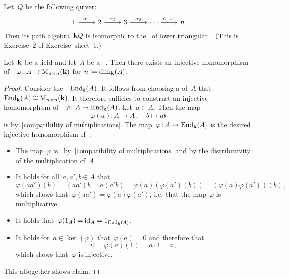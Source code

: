 \begin{example*}
  Let~$Q$ be the following quiver:
  \[
    \begin{tikzcd}
        1
        \arrow{r}[above]{\alpha_1}
      & 2
        \arrow{r}[above]{\alpha_2}
      & 3
        \arrow{r}[above]{\alpha_3}
      & \dotsb
        \arrow{r}[above]{\alpha_{n-1}}
      & n
    \end{tikzcd}
  \]
  Then its path algebra~$\mathbf{k} Q$ is isomorphic to the~{\kalg} of lower triangular~.
  (This is Exercise~2 of Exercise~sheet~1.)
\end{example*}


\begin{lemma}
  Let~$\mathbf{k}$ be a field and let~$A$ be a {\fd}~{\kalg}.
  Then there exists an injective homomorphism of~{\kalgs}~$\varphi \colon A \to \operatorname{M}_{n \times n}(\mathbf{k})$ for~$n \coloneqq \dim_{\mathbf{k}}(A)$.
\end{lemma}


\begin{proof}
  Consider the~{\kalg}~$\operatorname{End}_{\mathbf{k}}(A)$.
  It follows from choosing a  of~$A$ that~$\operatorname{End}_{\mathbf{k}}(A) \cong \operatorname{M}_{n \times n}(\mathbf{k})$.
  It therefore sufficies to construct an injective homomorphism of~{\kalgs}~$\varphi \colon A \to \operatorname{End}_{\mathbf{k}}(A)$.
  Let~$a \in A$.
  Then the map
  \[
            \varphi(a)
    \colon  A
    \to     A \,,
    \quad   b
    \mapsto ab
  \]
  is {\klin} by~\eqref{compatibility of multiplications}.
  The map~$\varphi \colon A \to \operatorname{End}_{\mathbf{k}}(A)$ is the desired injective homomorphism of~{\kalgs}:
  \begin{itemize}
    \item
      The map~$\varphi$ is~{\klin} by~\eqref{compatibility of multiplications} and by the distributivity of the multiplication of~$A$.
    \item
      It holds for all~$a, a', b \in A$ that
      \[
          \varphi(a a')(b)
        = (a a') b
        = a (a' b)
        = \varphi(a)( \varphi(a')(b) )
        = (\varphi(a) \varphi(a'))(b) \,,
      \]
      which shows that~$\varphi(a a') = \varphi(a) \varphi(a')$, i.e.\ that the map~$\varphi$ is multiplicative.
    \item
      It holds that~$\varphi(1_A) = \operatorname{id}_A = 1_{\operatorname{End}_{\mathbf{k}}(A)}$.
    \item
      It holds for~$a \in \ker(\varphi)$ that~$\varphi(a) = 0$ and therefore that
      \[
          0
        = \varphi(a)(1)
        = a \cdot 1
        = a \,,
      \]
      which shows that~$\varphi$ is injective.
  \end{itemize}
  This altogether shows claim.
\end{proof}





